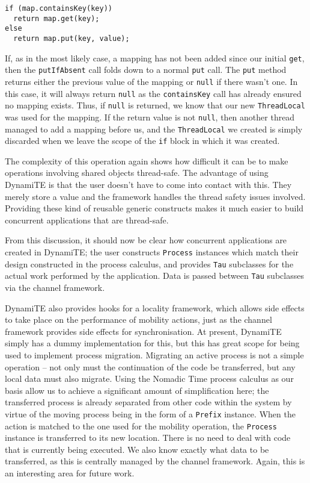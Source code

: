 \begin{verbatim}
if (map.containsKey(key))
  return map.get(key);
else
  return map.put(key, value);
\end{verbatim}

If, as in the most likely case, a mapping has not been added since our
initial \texttt{get}, then the \texttt{putIfAbsent} call folds down to
a normal \texttt{put} call.  The \texttt{put} method returns either
the previous value of the mapping or \texttt{null} if there wasn't
one.  In this case, it will always return \texttt{null} as the
\texttt{containsKey} call has already ensured no mapping exists.
Thus, if \texttt{null} is returned, we know that our new
\texttt{ThreadLocal} was used for the mapping.  If the return value is
not \texttt{null}, then another thread managed to add a mapping before
us, and the \texttt{ThreadLocal} we created is simply discarded when
we leave the scope of the \texttt{if} block in which it was created.

The complexity of this operation again shows how difficult it can be
to make operations involving shared objects thread-safe.  The
advantage of using DynamiTE is that the user doesn't have to come into
contact with this.  They merely store a value and the framework
handles the thread safety issues involved.  Providing these kind of
reusable generic constructs makes it much easier to build concurrent
applications that are thread-safe.

From this discussion, it should now be clear how concurrent
applications are created in DynamiTE; the user constructs
\texttt{Process} instances which match their design constructed in the
process calculus, and provides \texttt{Tau} subclasses for the actual
work performed by the application.  Data is passed between
\texttt{Tau} subclasses via the channel framework.

DynamiTE also provides hooks for a locality framework, which allows
side effects to take place on the performance of mobility actions,
just as the channel framework provides side effects for
synchronisation.  At present, DynamiTE simply has a dummy
implementation for this, but this has great scope for being used to
implement process migration.  Migrating an active process is not a
simple operation -- not only must the continuation of the code be
transferred, but any local data must also migrate.  Using the Nomadic
Time process calculus as our basis allow us to achieve a significant
amount of simplification here; the transferred process is already
separated from other code within the system by virtue of the moving
process being in the form of a \texttt{Prefix} instance.  When the
action is matched to the one used for the mobility operation, the
\texttt{Process} instance is transferred to its new location.  There
is no need to deal with code that is currently being executed.  We
also know exactly what data to be transferred, as this is centrally
managed by the channel framework.  Again, this is an interesting area
for future work.

